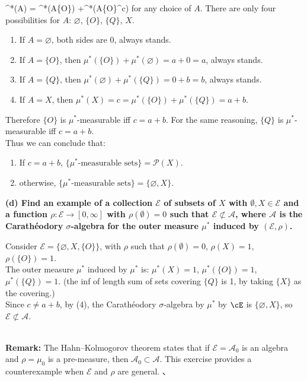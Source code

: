 \documentclass[lang=cn,11pt]{elegantbook}
\begin{document}
  \mu^*(A) \;=\;
  \mu^*(A\cap \{O\}) \;+\;\mu^*(A\cap \{O\}^c)
  \) for any choice of $A$.
There are only four possibilities for \(A\): \(\varnothing\), \(\{O\}\), \(\{Q\}\), \(X\).
\begin{enumerate}
    \item   If \(A = \varnothing\), both sides are 0, always stands.
    \item If \(A = \{O\}\), then \(\mu^*(\{O\}) + \mu^*(\varnothing)=a+0=a\), always stands.
    \item If \(A = \{Q\}\), then \(\mu^*(\varnothing)+\mu^*(\{Q\})=0+b=b\), always stands.
    \item If \(A = X\), then \(\mu^*(X)=c =\mu^*(\{O\})+\mu^*(\{Q\})=a+b\).
\end{enumerate}
\noindent Therefore $\{O\}$ is \(\mu^*\)-measurable iff $c =a+b$.  For the same reasoning, \(\{Q\}\) is \(\mu^*\)-measurable iff \(c = a+b\).\\
Thus we can conclude that:
\begin{enumerate}
    \item If \(c = a+b\), $\{   \mu^* \text{-measurable sets}   \} =  \mathcal{P}(X)$.
    \item otherwise, $\{   \mu^* \text{-measurable sets}   \} =  \{\varnothing, X\}$.
\end{enumerate}
\noindent \textbf{(d) Find an example of a collection \(\mathcal{E}\) of subsets of \(X\) with \(\emptyset, X \in \mathcal{E}\) and a function \(\rho : \mathcal{E} \to [0, \infty]\) with \(\rho(\emptyset) = 0\) such that \(\mathcal{E} \not\subset \mathcal{A}\), where \(\mathcal{A}\) is the Carathéodory \(\sigma\)-algebra for the outer measure \(\mu^*\) induced by \((\mathcal{E}, \rho)\).}
\begin{solution}
\noindent Consider \(\mathcal{E}=\{\varnothing,X,\{O\}\}\), with $\rho$ such that \(\rho(\emptyset)=0\), \(\rho(X)=1\), \(\rho(\{O\})=1\). \\ \noindent The outer measure \(\mu^*\) induced by $\mu^*$ is: \(\mu^*(X)=1\), \(\mu^*(\{O\})=1\), \(\mu^*(\{Q\})=1\). (the inf of length sum of sets covering $\{Q\}$ is 1, by taking $\{X\}$ as the covering.)\\
\noindent Since \(c \not = a+b\), by (4), the Carathéodory \(\sigma\)-algebra by $\mu^*$ by $\cE$ is \(\{\varnothing,X\}\), so \(\mathcal{E}\not\subset \mathcal{A}\).\\\\
\end{solution}
\noindent \textbf{Remark:} The Hahn–Kolmogorov theorem states that if \(\mathcal{E} = \mathcal{A}_0\) is an algebra and \(\rho = \mu_0\) is a pre-measure, then \(\mathcal{A}_0 \subset \mathcal{A}\). This exercise provides a counterexample when \(\mathcal{E}\) and \(\rho\) are general.
、
\end{document}
